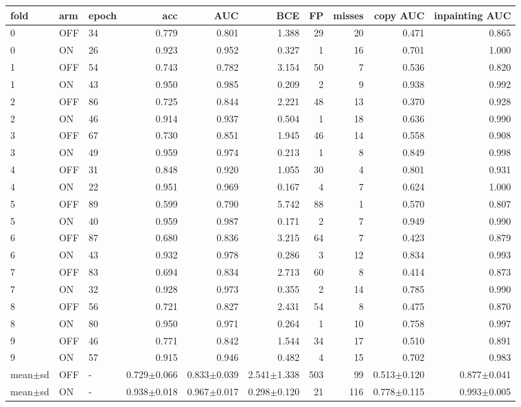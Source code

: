 \begin{tabular}{lllrrrrrrr}
\toprule
fold & arm & epoch & acc & AUC & BCE & FP & misses & copy AUC & inpainting AUC \\
\midrule
0 & OFF & 34 & 0.779 & 0.801 & 1.388 & 29 & 20 & 0.471 & 0.865 \\
0 & ON & 26 & 0.923 & 0.952 & 0.327 & 1 & 16 & 0.701 & 1.000 \\
1 & OFF & 54 & 0.743 & 0.782 & 3.154 & 50 & 7 & 0.536 & 0.820 \\
1 & ON & 43 & 0.950 & 0.985 & 0.209 & 2 & 9 & 0.938 & 0.992 \\
2 & OFF & 86 & 0.725 & 0.844 & 2.221 & 48 & 13 & 0.370 & 0.928 \\
2 & ON & 46 & 0.914 & 0.937 & 0.504 & 1 & 18 & 0.636 & 0.990 \\
3 & OFF & 67 & 0.730 & 0.851 & 1.945 & 46 & 14 & 0.558 & 0.908 \\
3 & ON & 49 & 0.959 & 0.974 & 0.213 & 1 & 8 & 0.849 & 0.998 \\
4 & OFF & 31 & 0.848 & 0.920 & 1.055 & 30 & 4 & 0.801 & 0.931 \\
4 & ON & 22 & 0.951 & 0.969 & 0.167 & 4 & 7 & 0.624 & 1.000 \\
5 & OFF & 89 & 0.599 & 0.790 & 5.742 & 88 & 1 & 0.570 & 0.807 \\
5 & ON & 40 & 0.959 & 0.987 & 0.171 & 2 & 7 & 0.949 & 0.990 \\
6 & OFF & 87 & 0.680 & 0.836 & 3.215 & 64 & 7 & 0.423 & 0.879 \\
6 & ON & 43 & 0.932 & 0.978 & 0.286 & 3 & 12 & 0.834 & 0.993 \\
7 & OFF & 83 & 0.694 & 0.834 & 2.713 & 60 & 8 & 0.414 & 0.873 \\
7 & ON & 32 & 0.928 & 0.973 & 0.355 & 2 & 14 & 0.785 & 0.990 \\
8 & OFF & 56 & 0.721 & 0.827 & 2.431 & 54 & 8 & 0.475 & 0.870 \\
8 & ON & 80 & 0.950 & 0.971 & 0.264 & 1 & 10 & 0.758 & 0.997 \\
9 & OFF & 46 & 0.771 & 0.842 & 1.544 & 34 & 17 & 0.510 & 0.891 \\
9 & ON & 57 & 0.915 & 0.946 & 0.482 & 4 & 15 & 0.702 & 0.983 \\
mean$\pm$sd & OFF & - & 0.729$\pm$0.066 & 0.833$\pm$0.039 & 2.541$\pm$1.338 & 503 & 99 & 0.513$\pm$0.120 & 0.877$\pm$0.041 \\
mean$\pm$sd & ON & - & 0.938$\pm$0.018 & 0.967$\pm$0.017 & 0.298$\pm$0.120 & 21 & 116 & 0.778$\pm$0.115 & 0.993$\pm$0.005 \\
\bottomrule
\end{tabular}

